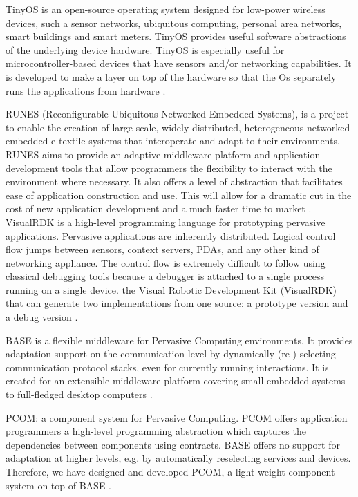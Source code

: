 TinyOS is an open-source operating system designed for low-power wireless devices, such a sensor networks, ubiquitous computing, personal area networks, smart buildings and smart meters. TinyOS provides useful software abstractions of the underlying device hardware. TinyOS is especially useful for microcontroller-based devices that have sensors and/or networking capabilities. It is developed to make a layer on top of the hardware so that the Os separately runs the applications from hardware \cite{33}.

RUNES (Reconfigurable Ubiquitous Networked Embedded Systems), is a project to enable the creation of large scale, widely distributed, heterogeneous networked embedded e-textile systems that interoperate and adapt to their environments. RUNES aims to provide an adaptive middleware platform and application development tools that allow programmers the flexibility to interact with the environment where necessary. It also offers a level of abstraction that facilitates ease of application construction and use. This will allow for a dramatic cut in the cost of new application development and a much faster time to market \cite{28}. \\

VisualRDK is a high-level programming language for prototyping pervasive applications. Pervasive applications are inherently distributed. Logical control flow jumps between sensors, context servers, PDAs, and any other kind of networking appliance. The control flow is extremely difficult to follow using classical debugging tools because a debugger is attached to a single process running on a single device. the Visual Robotic Development Kit (VisualRDK) that can generate two implementations from one source: a prototype version and a debug version \cite{30}.

BASE is a flexible middleware for Pervasive Computing environments. It provides adaptation support on the communication level by dynamically (re-) selecting communication protocol stacks, even for currently running interactions. It is created for an extensible middleware platform covering small embedded systems to full-fledged desktop computers \cite{31}.

PCOM: a component system for Pervasive Computing. PCOM offers application programmers a high-level programming abstraction which captures the dependencies between components using contracts. BASE offers no support for adaptation at higher levels, e.g. by automatically reselecting services and devices. Therefore, we have designed and developed PCOM, a light-weight component system on top of BASE \cite{32}. 

